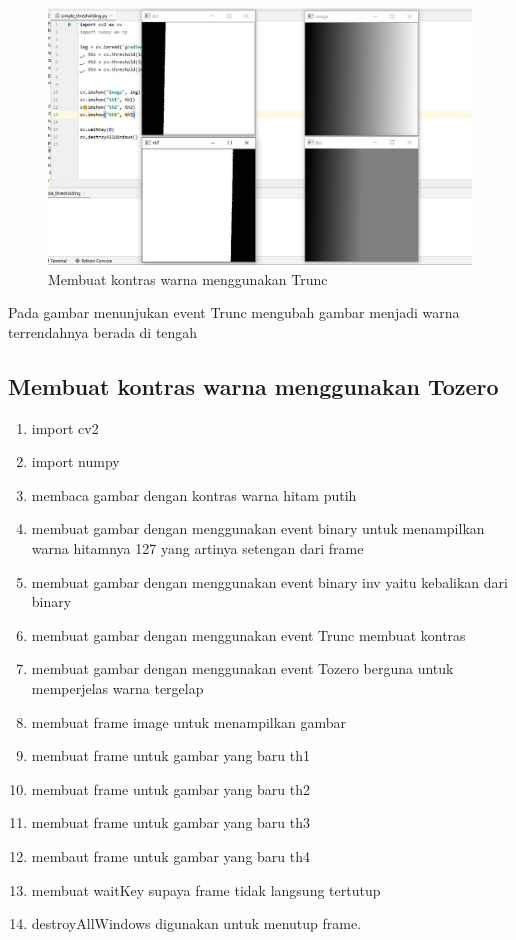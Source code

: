 \newpage
\begin{figure}[ht]
\centering
\includegraphics[scale=0.5]{figures/2,40.jpg}
\caption{Membuat kontras warna menggunakan Trunc}
\label{contoh}
\end{figure}
Pada gambar menunjukan event Trunc mengubah gambar menjadi warna terrendahnya berada di tengah




\newpage
\subsection{Membuat kontras warna menggunakan Tozero}

\begin{enumerate}
	\item import cv2
	\item import numpy
	\item membaca gambar dengan kontras warna hitam putih
	\item membuat gambar dengan menggunakan event binary untuk menampilkan warna hitamnya 127 yang artinya setengan dari frame
	\item membuat gambar dengan menggunakan event binary inv yaitu kebalikan dari binary
	\item membuat gambar dengan menggunakan event Trunc membuat kontras 
	\item membuat gambar dengan menggunakan event Tozero berguna untuk memperjelas warna tergelap
	\item membuat frame image untuk menampilkan gambar
	\item membuat frame untuk gambar yang baru th1
	\item membuat frame untuk gambar yang baru th2
	\item membuat frame untuk gambar yang baru th3
	\item membaut frame untuk gambar yang baru th4
	\item membuat waitKey supaya frame tidak langsung tertutup
	\item destroyAllWindows digunakan untuk menutup frame.
\end{enumerate}


